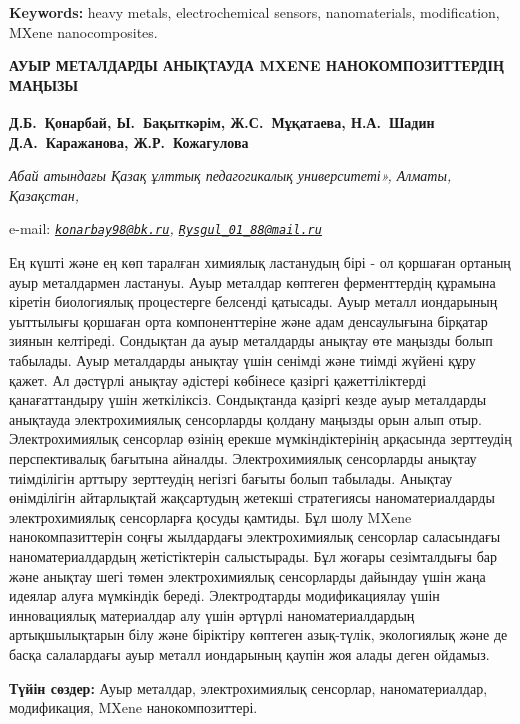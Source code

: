 {\bfseries Keywords:} heavy metals, electrochemical sensors, nanomaterials,
modification, MXene nanocomposites.

\begin{articleheader}
{\bfseries АУЫР МЕТАЛДАРДЫ АНЫҚТАУДА MXENE НАНОКОМПОЗИТТЕРДІҢ МАҢЫЗЫ}

{\bfseries
Д.Б.~Қонарбай\textsuperscript{\envelope },
Ы.~Бақыткәрім\textsuperscript{\envelope },
Ж.С.~Мұқатаева,
Н.А.~Шадин
Д.А.~Каражанова,
Ж.Р.~Кожагулова}
\end{articleheader}

\begin{affiliation}
\emph{Абай атындағы Қазақ ұлттық педагогикалық университеті», Алматы, Қазақстан,}

e-mail: \emph{\href{mailto:konarbay98@bk.ru}{\nolinkurl{konarbay98@bk.ru}}, \href{mailto:Rysgul_01_88@mail.ru}{\nolinkurl{Rysgul\_01\_88@mail.ru}}}
\end{affiliation}

Ең күшті және ең көп таралған химиялық ластанудың бірі - ол қоршаған
ортаның ауыр металдармен ластануы. Ауыр металдар көптеген ферменттердің
құрамына кіретін биологиялық процестерге белсенді қатысады. Ауыр металл
иондарының уыттылығы қоршаған орта компоненттеріне және адам
денсаулығына бірқатар зиянын келтіреді. Сондықтан да ауыр металдарды
анықтау өте маңызды болып табылады. Ауыр металдарды анықтау үшін сенімді
және тиімді жүйені құру қажет. Ал дәстүрлі анықтау әдістері көбінесе
қазіргі қажеттіліктерді қанағаттандыру үшін жеткіліксіз. Сондықтанда
қазіргі кезде ауыр металдарды анықтауда электрохимиялық сенсорларды
қолдану маңызды орын алып отыр. Электрохимиялық сенсорлар өзінің ерекше
мүмкіндіктерінің арқасында зерттеудің перспективалық бағытына айналды.
Электрохимиялық сенсорларды анықтау тиімділігін арттыру зерттеудің
негізгі бағыты болып табылады. Анықтау өнімділігін айтарлықтай
жақсартудың жетекші стратегиясы наноматериалдарды электрохимиялық
сенсорларға қосуды қамтиды. Бұл шолу MXene нанокомпазиттерін
соңғы жылдардағы электрохимиялық сенсорлар саласындағы
наноматериалдардың жетістіктерін салыстырады. Бұл жоғары
сезімталдығы бар және анықтау шегі төмен электрохимиялық
сенсорларды дайындау үшін жаңа идеялар алуға мүмкіндік береді.
Электродтарды модификациялау үшін инновациялық материалдар алу
үшін әртүрлі наноматериалдардың артықшылықтарын білу және
біріктіру көптеген азық-түлік, экологиялық және де басқа
салалардағы ауыр металл иондарының қаупін жоя алады деген
ойдамыз.

{\bfseries Түйін сөздер:} Ауы{\bfseries }р металдар, электрохимиялық
сенсорлар, наноматериалдар, модификация, MXene нанокомпозиттері.

